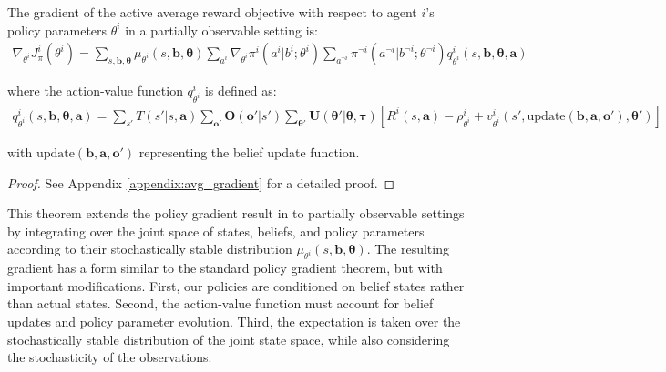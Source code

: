 \begin{theorem}
    \label{thm:avg_gradient}
    The gradient of the active average reward objective with respect to agent $i$'s policy parameters $\theta^i$ in a partially observable setting is:
    \begin{align}
        \nabla_{\theta^i} J^i_\pi(\theta^i) = \sum_{s, \boldsymbol{b}, \boldsymbol{\theta}} \mu_{\theta^i}(s, \boldsymbol{b}, \boldsymbol{\theta}) \sum_{a^i} \nabla_{\theta^i} \pi^i(a^i|b^i; \theta^i) \sum_{a^{\neg i}} \pi^{\neg i}(a^{\neg i}|b^{\neg i}; \theta^{\neg i}) q^i_{\theta^i}(s, \boldsymbol{b}, \boldsymbol{\theta}, \boldsymbol{a})
        \label{eq:avg_gradient}
    \end{align}

    where the action-value function $q^i_{\theta^i}$ is defined as:
    \begin{align}
        q^i_{\theta^i}(s, \boldsymbol{b}, \boldsymbol{\theta}, \boldsymbol{a}) = \sum_{s'} T(s'|s, \boldsymbol{a}) \sum_{\boldsymbol{o}'} \boldsymbol{O}(\boldsymbol{o}'|s') \sum_{\boldsymbol{\theta}'} \boldsymbol{U}(\boldsymbol{\theta}'|\boldsymbol{\theta}, \boldsymbol{\tau}) \left[ R^i(s, \boldsymbol{a}) - \rho^i_{\theta^i} + v^i_{\theta^i}(s', \text{update}(\boldsymbol{b}, \boldsymbol{a}, \boldsymbol{o}'), \boldsymbol{\theta}') \right]
        \label{eq:avg_action_value}
    \end{align}

    with $\text{update}(\boldsymbol{b}, \boldsymbol{a}, \boldsymbol{o}')$ representing the belief update function.

\end{theorem}

\begin{proof}
    See Appendix \ref{appendix:avg_gradient} for a detailed proof.
\end{proof}
This theorem extends the policy gradient result in \citet{kim2022influencing} to partially observable settings by integrating over the joint space of states, beliefs, and policy parameters according to their stochastically stable distribution $\mu_{\theta^i}(s, \boldsymbol{b}, \boldsymbol{\theta})$. The resulting gradient has a form similar to the standard policy gradient theorem, but with important modifications. First, our policies are conditioned on belief states rather than actual states. Second, the action-value function must account for belief updates and policy parameter evolution. Third, the expectation is taken over the stochastically stable distribution of the joint state space, while also considering the stochasticity of the observations.

